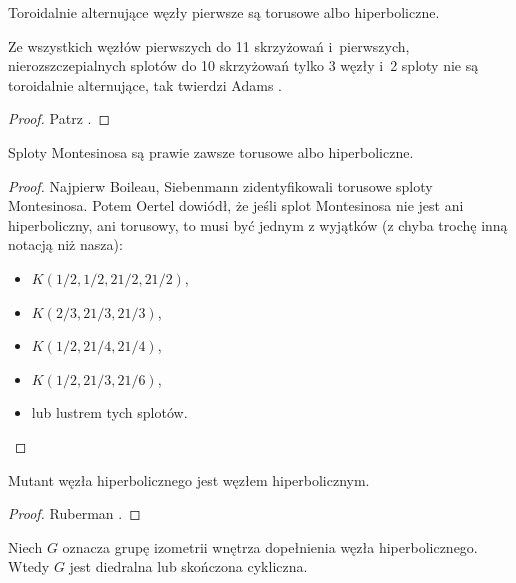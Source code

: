 \begin{proposition}
    Toroidalnie alternujące węzły pierwsze są torusowe albo hiperboliczne.
\end{proposition}

Ze wszystkich węzłów pierwszych do 11 skrzyżowań i~pierwszych, nierozszczepialnych splotów do 10 skrzyżowań tylko 3 węzły i~2 sploty nie są toroidalnie alternujące, tak twierdzi Adams \cite{adams05}.

\begin{proof}
    Patrz \cite{adams994}.
\end{proof}

\begin{proposition}
%
    Sploty Montesinosa są prawie zawsze torusowe albo hiperboliczne.
\end{proposition}

\begin{proof}
    Najpierw Boileau, Siebenmann \cite{boileau80} zidentyfikowali torusowe sploty Montesinosa.
    Potem Oertel \cite{oertel84} dowiódł, że jeśli splot Montesinosa nie jest ani hiperboliczny, ani torusowy, to musi być jednym z wyjątków (z chyba trochę inną notacją niż nasza):
    \begin{itemize}
        \item $K(1/2, 1/2, 21/2, 21/2)$,
        \item $K(2/3, 21/3, 21/3)$,
        \item $K(1/2, 21/4, 21/4)$,
        \item $K(1/2, 21/3, 21/6)$,
        \item lub lustrem tych splotów. \qedhere
    \end{itemize}
\end{proof}

\begin{proposition}
    Mutant węzła hiperbolicznego jest węzłem hiperbolicznym.
\end{proposition}

\begin{proof}
%
    Ruberman \cite[wniosek 1.4]{ruberman87}.
\end{proof}

\begin{proposition}
    Niech $G$ oznacza grupę izometrii wnętrza dopełnienia węzła hiperbolicznego.
    Wtedy $G$ jest diedralna lub skończona cykliczna.
\end{proposition}

